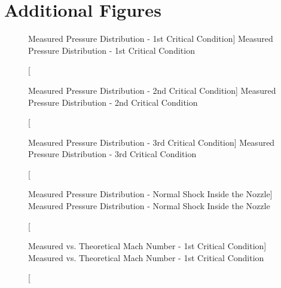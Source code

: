 \newpage

\section{Additional Figures} \label{sec:additional_figures}

\begin{figure}[htpb]
    \centering
     
     \caption
     [Measured Pressure Distribution - 1st Critical Condition]
     {Measured Pressure Distribution - 1st Critical Condition}
     \label{fig: MeasuredPressureDistribution1stCriticalCondition}
\end{figure}

\begin{figure}[htpb]
    \centering
     
     \caption
     [Measured Pressure Distribution - 2nd Critical Condition]
     {Measured Pressure Distribution - 2nd Critical Condition}
     \label{fig: MeasuredPressureDistribution2ndCriticalCondition}
\end{figure}

\begin{figure}[htpb]
    \centering
     
     \caption
     [Measured Pressure Distribution - 3rd Critical Condition]
     {Measured Pressure Distribution - 3rd Critical Condition}
     \label{fig: MeasuredPressureDistribution3rdCriticalCondition}
\end{figure}

\begin{figure}[htpb]
    \centering
     
     \caption
     [Measured Pressure Distribution - Normal Shock Inside the Nozzle]
     {Measured Pressure Distribution - Normal Shock Inside the Nozzle}
     \label{fig: MeasuredPressureDistributionNormalShockInsidetheNozzle}
\end{figure}

\begin{figure}[htpb]
    \centering
     
     \caption
     [Measured vs. Theoretical Mach Number - 1st Critical Condition]
     {Measured vs. Theoretical Mach Number - 1st Critical Condition}
     \label{fig: MeasuredvsTheoreticalMachNumber1stCriticalCondition}
\end{figure}

